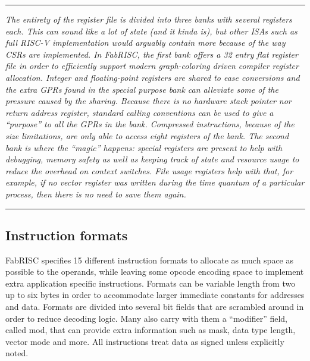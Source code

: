 \documentclass{article}
\begin{document}
        \par\noindent\rule{\textwidth}{0.4pt}
        \textit{The entirety of the register file is divided into three banks with several registers each. This can sound like a lot of state (and it kinda is), but other ISAs such as full RISC-V implementation would arguably contain more because of the way CSRs are implemented. In FabRISC, the first bank offers a 32 entry flat register file in order to efficiently support modern graph-coloring driven compiler register allocation. Integer and floating-point registers are shared to ease conversions and the extra GPRs found in the special purpose bank can alleviate some of the pressure caused by the sharing. Because there is no hardware stack pointer nor return address register, standard calling conventions can be used to give a ``purpose'' to all the GPRs in the bank. Compressed instructions, because of the size limitations, are only able to access eight registers of the bank. The second bank is where the ``magic'' happens: special registers are present to help with debugging, memory safety as well as keeping track of state and resource usage to reduce the overhead on context switches. File usage registers help with that, for example, if no vector register was written during the time quantum of a particular process, then there is no need to save them again.}
        \par\noindent\rule{\textwidth}{0.4pt}

        \subsection{Instruction formats}

            \vspace{10pt}

            FabRISC specifies 15 different instruction formats to allocate as much space as possible to the operands, while leaving some opcode encoding space to implement extra application specific instructions. Formats can be variable length from two up to six bytes in order to accommodate larger immediate constants for addresses and data. Formats are divided into several bit fields that are scrambled around in order to reduce decoding logic. Many also carry with them a ``modifier'' field, called mod, that can provide extra information such as mask, data type length, vector mode and more. All instructions treat data as signed unless explicitly noted.

            \vspace{10pt}
            
            \vspace{10pt}
\end{document}
